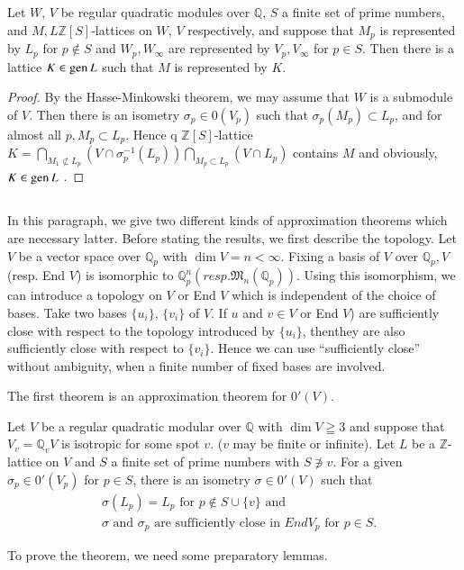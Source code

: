 \setcounter{section}{2}
\setcounter{theorem}{27}
\begin{theorem}\label{c2:thm-2.28}
Let $W$, $V$ be regular quadratic modules over $\mathbb{Q}$, $S$ a
finite set of prime numbers, and $M,L\mathbb{Z}[S]$-lattices on $W$,
$V$ respectively, and suppose that $M_p$ is represented by $L_p$ for
$p\not\in S$ and $W_p, W_{\infty}$ are represented by $V_p,
V_{\infty}$ for $p\in S$. Then there is a lattice
$K\in \operatorname{gen} L$ such that $M$ is represented by $K$. 
\end{theorem}

\begin{proof}
By the Hasse-Minkowski theorem, we may assume that $W$ is a submodule
of $V$. Then there is an isometry $\sigma_p \in 0(V_p)$ such
that $\sigma_p(M_p) \subset L_p$, and for almost all $p, M_p\subset
L_p$. Hence q $\mathbb{Z}[S]$-lattice
$K=\bigcap\limits_{M_1\not\subset L_p} (V\cap \sigma^{-1}_p
(L_p)) \bigcap\limits_{M_p\subset L_p} (V\cap L_p)$ contains $M$ and
obviously, $K\in \operatorname{gen} L$ .
\end{proof}

\subsection{}\label{c2:subsec2.4.2}
 In this paragraph, we give two
different kinds of approximation theorems which are necessary
latter. Before stating the results, we first describe the
topology. Let $V$ be a vector space over $\mathbb{Q}_p$ with $\dim
V=n<\infty$. Fixing a basis of $V$ over $\mathbb{Q}_p, V$ (resp. End
$V$) is isomorphic to $\mathbb{Q}^n_p
(resp. \mathfrak{M}_n(\mathbb{Q}_p))$. Using this isomorphism, we can
introduce a topology on $V$ or End $V$ which is independent of the
choice of bases. Take two bases $\{u_i\}$, $\{v_i\}$ of $V$. If $u$
and $v \in V$ or End $V$) are sufficiently close with respect
to the topology introduced by $\{u_i\}$, then\pageoriginale they are
also sufficiently close with respect to $\{v_i\}$. Hence we can use
``sufficiently close'' without ambiguity, when a finite number of
fixed bases are involved.

The first theorem is an approximation theorem for $0'(V)$. 

\begin{theorem}\label{c2:thm-2.29}
Let $V$ be a regular quadratic modular over $\mathbb{Q}$ with $\dim
V \geqq 3$ and suppose that $V_v=\mathbb{Q}_vV$ is isotropic for some
spot $v$. ($v$ may be finite or infinite). Let $L$ be a
$\mathbb{Z}$-lattice on $V$ and $S$ a finite set of prime numbers
with $S\not\ni v$. For a given $\sigma_p \in 0'(V_p)$ for
$p\in S$, there is an isometry $\sigma \in 0'(V)$ such
that 
\begin{align*}
& \sigma(L_p) = L_p \text{ for } p \not\in S \cup \{ v\} \text{ and}\\
& \sigma \text{ and } \sigma_p \text{ are sufficiently close in } End
V_p \text{ for } p \in S. 
\end{align*}

To prove the theorem, we need some preparatory lemmas.
\end{theorem}

